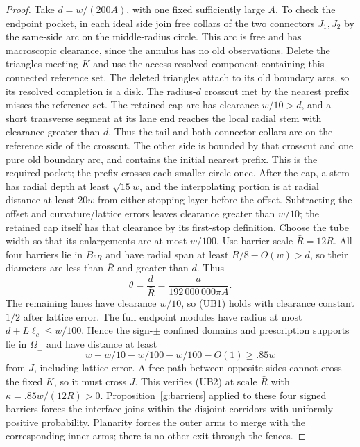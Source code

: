 \begin{proof}
Take \(d=w/(200A)\), with one fixed sufficiently large \(A\).  To check
the endpoint pocket, in each ideal side join free collars of the two
connectors \(J_1,J_2\) by the same-side arc on the middle-radius circle.
This arc is free and has macroscopic clearance, since the annulus has no
old observations.  Delete the triangles meeting \(K\) and use the
access-resolved component containing this connected reference set.  The
deleted triangles attach to its old boundary arcs, so its resolved
completion is a disk.  The radius-\(d\) crosscut met by the nearest
prefix misses the reference set.  The retained cap arc has clearance
\(w/10>d\), and a short transverse segment at its lane end reaches the
local radial stem with clearance greater than \(d\).  Thus the tail and
both connector collars are on the reference side of the crosscut.  The
other side is bounded by that crosscut and one pure old boundary arc,
and contains the initial nearest prefix.  This is the required pocket;
the prefix crosses each smaller circle once.  After the cap, a stem has
radial depth at least \(\sqrt{15}w\), and the interpolating portion is
at radial distance at least \(20w\) from either stopping layer before
the offset.  Subtracting the offset and curvature/lattice errors leaves
clearance greater than \(w/10\); the retained cap itself has that
clearance by its first-stop definition.  Choose the tube width so that its enlargements are
at most \(w/100\).
Use barrier scale \(\bar R=12R\). All four barriers lie in
\(B_{6R}\) and have radial span at least \(R/8-O(w)>d\), so their
diameters are less than \(\bar R\) and greater than \(d\). Thus
\[
       \theta=\frac{d}{\bar R}
              =\frac{a}{192\,000\,000\pi A}.
\]
The remaining lanes have clearance \(w/10\), so (UB1) holds with
clearance constant \(1/2\) after lattice error. The full endpoint
modules have radius
at most \(d+L\ell_c\le w/100\). Hence the sign-\(\pm\) confined
domains and prescription supports lie in \(\Omega_\pm\) and have
distance at least
\[
             w-w/10-w/100-w/100-O(1)\ge .85w
\]
from \(J\), including lattice error. A free path between opposite
sides cannot cross the fixed \(K\), so it must cross \(J\).
This verifies (UB2) at scale \(\bar R\) with
\(\kappa=.85w/(12R)>0\).
Proposition~\ref{g:barriers} applied to these four signed barriers
forces the interface joins within the disjoint corridors with
uniformly positive probability. Planarity forces the outer arms to
merge with the corresponding inner arms; there is no other exit
through the fences.


\end{proof}
